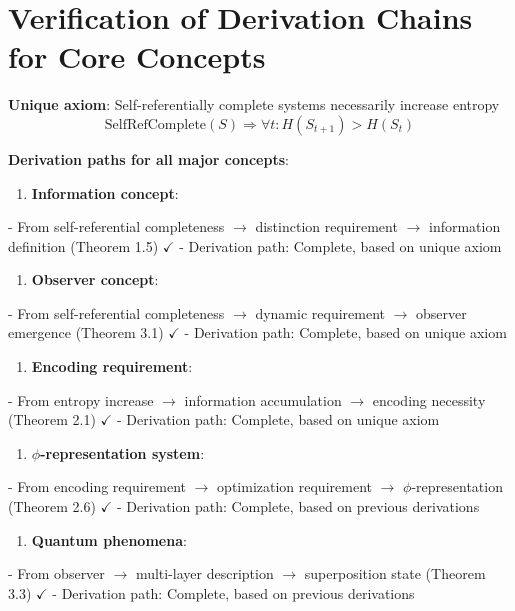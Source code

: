 
\section{Verification of Derivation Chains for Core Concepts}
\label{sec:ch08_completeness:verification-of-derivation-chains-for-core-concepts}

\textbf{Unique axiom}: Self-referentially complete systems necessarily increase entropy
\begin{equation}
\text{SelfRefComplete}(S) \Rightarrow \forall t: H(S_{t+1}) > H(S_t)
\end{equation}

\textbf{Derivation paths for all major concepts}:

\begin{enumerate}
\item \textbf{Information concept}:
\end{enumerate}
   - From self-referential completeness $\rightarrow$ distinction requirement $\rightarrow$ information definition (Theorem 1.5) $\checkmark$
   - Derivation path: Complete, based on unique axiom

\begin{enumerate}
\item \textbf{Observer concept}:
\end{enumerate}
   - From self-referential completeness $\rightarrow$ dynamic requirement $\rightarrow$ observer emergence (Theorem 3.1) $\checkmark$
   - Derivation path: Complete, based on unique axiom

\begin{enumerate}
\item \textbf{Encoding requirement}:
\end{enumerate}
   - From entropy increase $\rightarrow$ information accumulation $\rightarrow$ encoding necessity (Theorem 2.1) $\checkmark$
   - Derivation path: Complete, based on unique axiom

\begin{enumerate}
\item \textbf{$\phi$-representation system}:
\end{enumerate}
   - From encoding requirement $\rightarrow$ optimization requirement $\rightarrow$ $\phi$-representation (Theorem 2.6) $\checkmark$
   - Derivation path: Complete, based on previous derivations

\begin{enumerate}
\item \textbf{Quantum phenomena}:
\end{enumerate}
   - From observer $\rightarrow$ multi-layer description $\rightarrow$ superposition state (Theorem 3.3) $\checkmark$
   - Derivation path: Complete, based on previous derivations

